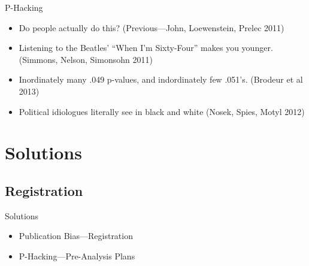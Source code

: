 \documentclass{beamer}
\begin{document}
{     \begin{frame}[plain]
     \end{frame}
}
\begin{frame}{P-Hacking}
\begin{itemize}
\item
Do people actually do this? (Previous---John, Loewenstein, Prelec 2011)
\item
Listening to the Beatles' ``When I'm Sixty-Four'' makes you younger. (Simmons, Nelson, Simonsohn 2011)
\item
Inordinately many .049 p-values, and indordinately few .051's. (Brodeur et al 2013)
\item 
Political idiologues literally see in black and white (Nosek, Spies, Motyl 2012)
\end{itemize}
\end{frame}



\section{Solutions}
\subsection{Registration}
\begin{frame}{Solutions}
\begin{itemize}
\item
Publication Bias---Registration
\item
P-Hacking---Pre-Analysis Plans
\end{itemize}
\end{frame}
\end{document}
